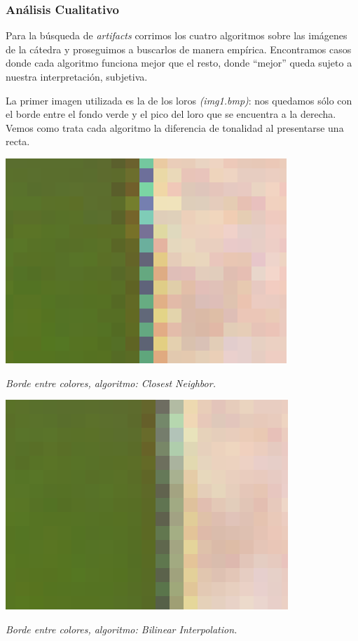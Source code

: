 \newpage

\subsubsection{Análisis Cualitativo}

Para la búsqueda de \textit{artifacts} corrimos los cuatro algoritmos sobre las imágenes de la cátedra y proseguimos a buscarlos de manera empírica. Encontramos casos donde cada algoritmo funciona mejor que el resto, donde ``mejor'' queda sujeto a nuestra interpretación, subjetiva.

La primer imagen utilizada es la de los loros \textit{(img1.bmp)}: nos quedamos sólo con el borde entre el fondo verde y el pico del loro que se encuentra a la derecha. Vemos como trata cada algoritmo la diferencia de tonalidad al presentarse una recta. 

	\begin{center}
		\includegraphics[scale=.5]{../enunciado/images_files/cualitativo/pico_loro_closest.png}
		\vspace{2pt}
		\par
		\footnotesize\textit{Borde entre colores, algoritmo: Closest Neighbor.}
	\end{center}

	\begin{center}
		\includegraphics[scale=.5]{../enunciado/images_files/cualitativo/pico_loro_bilinear.png}
		\vspace{2pt}
		\par
		\footnotesize\textit{Borde entre colores, algoritmo: Bilinear Interpolation.}
	\end{center}

